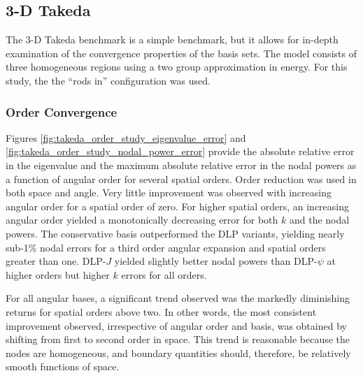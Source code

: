 \subsection{3-D Takeda}

The 3-D Takeda benchmark is a simple benchmark, but it
allows for in-depth examination of the convergence properties of 
the basis sets.  The model consists of three homogeneous regions using 
a two group approximation in energy.  For this study, the the ``rods in''
configuration was used.

\subsubsection{Order Convergence}

Figures \ref{fig:takeda_order_study_eigenvalue_error} and
\ref{fig:takeda_order_study_nodal_power_error} provide the absolute 
relative error in the eigenvalue and the maximum 
absolute relative error in the nodal powers as a function of angular 
order for several spatial orders.  Order reduction was used in 
both space and angle.  Very little improvement was observed
with increasing angular order for a spatial order of zero.  
For higher spatial orders, an increasing angular order 
yielded a monotonically decreasing error for both $k$ and the nodal 
powers.  The conservative basis outperformed the DLP variants, yielding
nearly sub-1\% nodal errors for a third order angular expansion and 
spatial orders greater than one.  DLP-$J$ yielded slightly 
better nodal powers than DLP-$\psi$ at higher orders but higher 
$k$ errors for all orders. 

For all angular bases, a significant trend observed was the markedly
diminishing returns for spatial orders above 
two.  In other words, the most consistent improvement observed,
irrespective of angular order and basis, was obtained by shifting 
from first to second order in space.  This trend is reasonable because 
the nodes are homogeneous, and boundary quantities should, therefore, 
be relatively smooth functions of space.

